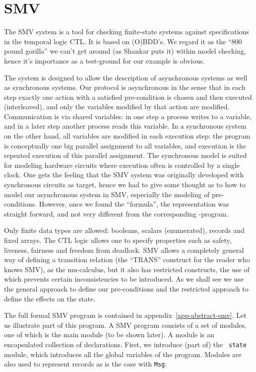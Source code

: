 \section{SMV}

The SMV system \cite{McMil:SMV} is a  tool for checking finite-state systems
against specifications  in the  temporal logic  CTL.   It is  based on
(O)BDD's. We regard it as the ``800  pound gorilla'' we can't get around
(as Shankar puts it) within model checking, hence it's importance as a
test-ground for our example is obvious.

The  system is designed   to   allow the description  of  asynchronous
systems as well as synchronous systems.   Our protocol is asynchronous
in the sense that in  each step exactly  one  action with a  satisfied
pre-condition is chosen and  then executed (interleaved), and only the
variables  modified by that action  are modified. Communication is via
shared variables: in one step a process writes  to a variable, and in
a later  step another process  reads this variable.   In a synchronous
system on the other hand, all variables are modified in each execution
step: the  program is conceptually one  big parallel assignment to all
variables,  and execution is  the repeated  execution of this parallel
assignment.  The  synchronous  model is suited  for  modeling hardware
circuits where  execution often is controlled by  a  single clock. One
gets the feeling that  the  SMV system  was originally developed  with
synchronous circuits as  target, hence we  had to give some thought as
to  how  to model our   asynchronous system   in SMV,  especially  the
modeling of pre-conditions.  However, once we found the ``formula'', the
representation  was straight forward, and not  very different from the
corresponding \Murphi-program.

Only finite  data types are  allowed: booleans,  scalars (enumerated),
records  and   fixed arrays.  The   CTL  logic allows  one  to specify
properties  such  as safety,    liveness,  fairness and  freedom  from
deadlock.   SMV  allows   a  completely general   way   of  defining a
transition relation  (the ``TRANS'' construct for  the reader  who knows
SMV), as  the mu-calculus, but  it also has  restricted constructs, the
use of which prevents certain inconsistencies to  be introduced. As we
shall see we use the general approach to define our pre-conditions and
the restricted approach to define the effects on the state.

The     full    formal     SMV   program     is       contained     in
appendix~\ref{app-abstract-smv}.  Let  us   illustrate  part  of  this
program. A SMV  program consists of a set  of modules, one of which is
the main  module  (to be shown   later).  A module is  an encapsulated
collection of declarations.  First, we  introduce  (part of) the  {\tt
state} module,  which introduces   all  the  global variables   of the
program.  Modules  are also used to represent  records as  is the case
with {\tt Msg}:


